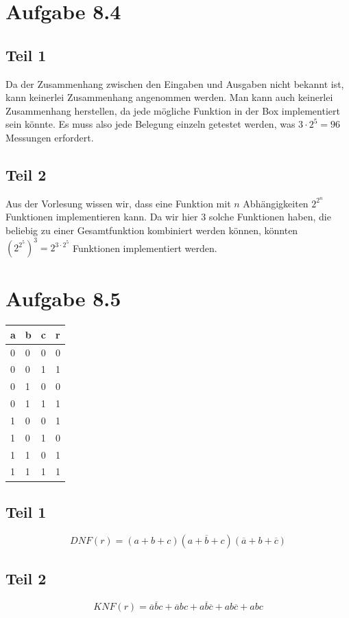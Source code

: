 \documentclass[10pt,a4paper]{article}
\begin{document}
\section*{Aufgabe 8.4}

\subsection*{Teil 1}

Da der Zusammenhang zwischen den Eingaben und Ausgaben nicht bekannt ist, kann keinerlei Zusammenhang angenommen werden.
Man kann auch keinerlei Zusammenhang herstellen, da jede mögliche Funktion in der Box implementiert sein könnte.
Es muss also jede Belegung einzeln getestet werden, was $3 \cdot 2^{5} = 96$ Messungen erfordert.

\subsection*{Teil 2}

Aus der Vorlesung wissen wir, dass eine Funktion mit $n$ Abhängigkeiten $2^{2^{n}}$ Funktionen implementieren kann.
Da wir hier 3 solche Funktionen haben, die beliebig zu einer Gesamtfunktion kombiniert werden können, könnten $(2^{2^{5}})^{3} = 2^{3 \cdot 2^{5}}$ Funktionen implementiert werden.

\section*{Aufgabe 8.5}

\begin{tabular}{l|l|l|l}
a & b & c & r\\ \hline
0 & 0 & 0 & 0\\ \hline
0 & 0 & 1 & 1\\ \hline
0 & 1 & 0 & 0\\ \hline
0 & 1 & 1 & 1\\ \hline
1 & 0 & 0 & 1\\ \hline
1 & 0 & 1 & 0\\ \hline
1 & 1 & 0 & 1\\ \hline
1 & 1 & 1 & 1\\ \hline
\end{tabular}

\subsection*{Teil 1}

\begin{equation}
DNF(r) = (a + b + c)(a + \overline{b} + c)(\overline{a} + b + \overline{c})
\end{equation}

\subsection*{Teil 2}

\begin{equation}
KNF(r) = \overline{a}\overline{b}c + \overline{a}bc + a\overline{b}\overline{c} + ab\overline{c} + abc
\end{equation}
\end{document}
